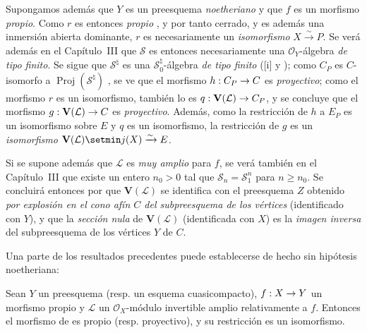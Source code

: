 \documentclass[oneside,10pt]{amsart}
\makeatletter
\newcommand{\ega@arrow}[2]{\mathchoice{#1}{#2}{#2}{#2}}
\renewcommand{\to}{\ega@arrow{\longrightarrow}{\rightarrow}}
\let\EGAOriginalLabel\label
\renewcommand{\label}[1]{\phantomsection\EGAOriginalLabel{#1}}
\makeatother
\begin{document}
\begin{remark}[8.8.3]
\label{II.8.8.3-fr}
Supongamos además que $Y$ es un preesquema \emph{noetheriano} y que $f$ es un morfismo \emph{propio}.
Como $r$ es entonces \emph{propio} , y por tanto cerrado, y es además una inmersión abierta dominante, $r$ es necesariamente un \emph{isomorfismo} $X\xrightarrow{\sim}P$.
Se verá además en el Capítulo~III  que $\mathcal{S}$ es entonces necesariamente una $\mathcal{O}_Y$-álgebra \emph{de tipo finito}.
Se sigue que $\mathcal{S}^{\natural}$ es una $\mathcal{S}_0^{\natural}$-álgebra \emph{de tipo finito} ([i] y );
como $C_P$ es $C$-isomorfo a $\operatorname{Proj}(\mathcal{S}^{\natural})$ , se ve que el morfismo $h:C_P\to C$ es \emph{proyectivo};
como el morfismo $r$ es un isomorfismo, también lo es $q:\mathbf{V}(\mathcal{L})\to C_P$, y se concluye que el morfismo $g:\mathbf{V}(\mathcal{L})\to C$ es \emph{proyectivo}.
Además, como la restricción de $h$ a $E_P$ es un isomorfismo sobre $E$ y $q$ es un isomorfismo, la restricción  de $g$ es un \emph{isomorfismo} $\mathbf{V}(\mathcal{L})\setmin j(X)\xrightarrow{\sim}E$.

Si se supone además que $\mathcal{L}$ es \emph{muy amplio} para $f$, se verá también en el Capítulo~III  que existe un entero $n_0>0$ tal que $\mathcal{S}_n=\mathcal{S}_1^n$ para $n\geqslant n_0$.
Se concluirá entonces por  que $\mathbf{V}(\mathcal{L})$ se identifica con el preesquema $Z$ obtenido \emph{por explosión en el cono afín $C$ del subpreesquema de los vértices} (identificado con $Y$),
y que la \emph{sección nula} de $\mathbf{V}(\mathcal{L})$ (identificada con $X$) es la \emph{imagen inversa} del subpreesquema de los vértices $Y$ de $C$.

Una parte de los resultados precedentes puede establecerse de hecho sin hipótesis noetheriana:
\end{remark}
\begin{corollary}[8.8.4]
\label{II.8.8.4-fr}
Sean $Y$ un preesquema \textup{(resp.} un esquema cuasicompacto\textup{)}, $f:X\to Y$ un morfismo propio y $\mathcal{L}$ un $\mathcal{O}_X$-módulo invertible amplio relativamente a $f$.
Entonces el morfismo de  es propio \textup{(resp.} proyectivo\textup{)}, y su restricción  es un isomorfismo.
\end{corollary}
\end{document}
